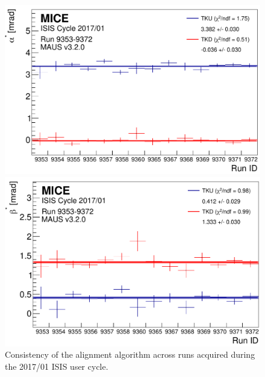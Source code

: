 \begin{figure} [!htb]
	\begin{minipage}[b]{.45\textwidth}
		\centering
		\includegraphics[width=\textwidth]{data_final/alpha_bestfit_edit.pdf}
	\end{minipage}
	\hfill
	\begin{minipage}[b]{.45\textwidth}
		\centering
		\includegraphics[width=\textwidth]{data_final/beta_bestfit_edit.pdf}
	\end{minipage}
	\caption{Consistency of the alignment algorithm across runs acquired during the 2017/01 ISIS user cycle.}
	\label{fig:runtorun}
\end{figure}
